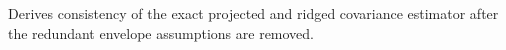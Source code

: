 Derives consistency of the exact projected and ridged covariance estimator after the redundant envelope assumptions are removed.